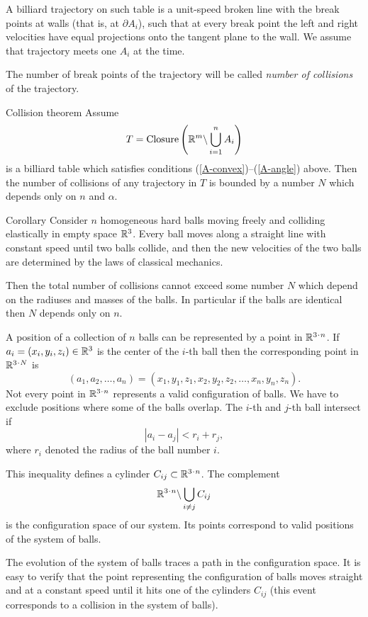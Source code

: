 A billiard trajectory on such table is a unit-speed broken line 
with the break points at walls (that is, at $\partial A_i$),
such that at every break
point the left and right velocities have equal projections onto the tangent
plane to the wall.
We assume that trajectory meets one $A_i$ at the time.

The number of break
points of the trajectory will be called \emph{number of collisions} of the trajectory.

\begin{thm}{Collision theorem}\label{thm:baby-collision}
Assume 
$$T=\mathop{\rm Closure}\nolimits\left(\mathbb{R}^m\backslash \bigcup_{i=1}^n A_i\right)$$
is a billiard table which satisfies conditions (\ref{A-convex})--(\ref{A-angle}) above.
Then the number of collisions of any trajectory in  $T$  is bounded
by a number $N$ which depends only on $n$ and $\alpha$.

\end{thm}

\begin{thm}{Corollary}\label{cor:balls}
Consider $n$ homogeneous hard balls
moving freely and colliding
elastically in empty space $\mathbb{R}^3$. 
Every ball moves
along a straight line with constant speed until two balls collide, and then
the new velocities of the two balls are determined by the
laws of classical mechanics.

Then the total number of collisions cannot exceed some number $N$ which depend on the radiuses and masses of the balls.
In particular if the balls are identical then $N$ depends only on $n$.
\end{thm}

A position of a collection of $n$ balls can be represented by a point in $\RR^{3\cdot n}$.
If $a_i=(x_i,y_i,z_i) \in \RR^3$ is the center of the $i$-th ball
then
the corresponding point in $\RR^{3\cdot N}$ is
$$(a_1, a_2 , \dots , a_n ) = (x_1, y_1 , z_1 , x_2 , y_2 , z_2 , \dots , x_n , y_n , z_n).$$
Not every point in $\RR^{3\cdot n}$ represents a valid configuration of balls. 
We have to exclude positions where some of the balls overlap. 
The $i$-th and $j$-th ball intersect if 
$$|a_i - a_j | < r_i+r_j,$$
where $r_i$ denoted the radius of the ball number $i$.

This inequality defines a cylinder $C_{ij} \subset \RR^{3\cdot n}$. 
The complement
$$\RR^{3\cdot n}\backslash \bigcup_{i\ne j} C_{ij}$$ is the configuration space of our system. 
Its points correspond
to valid positions of the system of balls.

The evolution of the system
of balls traces a path in the configuration space. 
It is easy to verify that
the point representing the configuration of balls moves straight and at a
constant speed until it hits one of the cylinders $C_{ij}$ (this event corresponds
to a collision in the system of balls).

